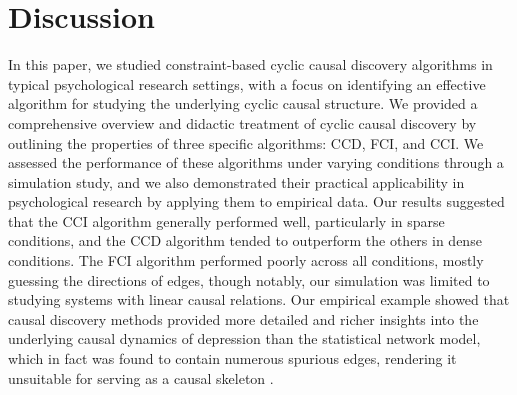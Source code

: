 \documentclass[twoside, 11pt]{article}
\begin{document}
\section{Discussion}
In this paper, we studied constraint-based cyclic causal discovery algorithms in typical psychological research settings, with a focus on identifying an effective algorithm for studying the underlying cyclic causal structure. We provided a comprehensive overview and didactic treatment of cyclic causal discovery by outlining the properties of three specific algorithms: CCD, FCI, and CCI. 
We assessed the performance of these algorithms under varying conditions through a simulation study, and we also demonstrated their practical applicability in psychological research by applying them to empirical data. 
Our results suggested that the CCI algorithm generally performed well, particularly in sparse conditions, and the CCD algorithm tended to outperform the others in dense conditions. The FCI algorithm performed poorly across all conditions, mostly guessing the directions of edges, though notably, our simulation was limited to studying systems with linear causal relations. Our empirical example showed that causal discovery methods provided more detailed and richer insights into the underlying causal dynamics of depression than the statistical network model, which in fact was found to contain numerous spurious edges, rendering it unsuitable for serving as a causal skeleton \citep{Ryan2022}. 
\end{document}
